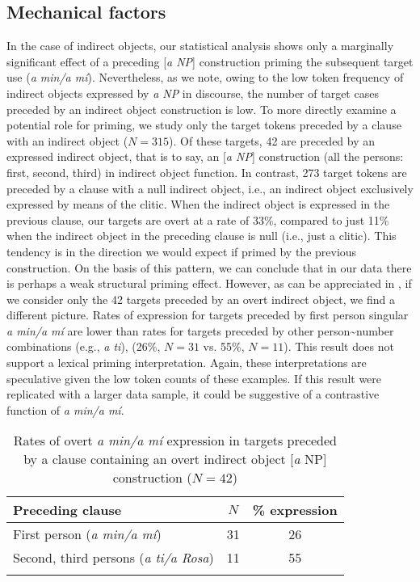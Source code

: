 \documentclass[output=paper]{langscibook}
\begin{document}
\subsection{Mechanical factors} In the case of indirect objects, our statistical analysis shows only a marginally significant effect of a preceding [\textit{a NP}] construction priming the subsequent target use (\textit{a min\slash a mí}). Nevertheless, as we note, owing to the low token frequency of indirect objects expressed by \textit{a NP} in discourse, the number of target cases preceded by an indirect object construction is low. To more directly examine a potential role for priming, we study only the target tokens preceded by a clause with an indirect object ($N=315$). Of these targets, 42 are preceded by an expressed indirect object, that is to say, an [\textit{a NP}] construction (all the persons: first, second, third) in indirect object function. In contrast, 273 target tokens are preceded by a clause with a null indirect object, i.e., an indirect object exclusively expressed by means of the clitic. When the indirect object is expressed in the previous clause, our targets are overt at a rate of 33\%, compared to just 11\% when the indirect object in the preceding clause is null (i.e., just a clitic). This tendency is in the direction we would expect if primed by the previous construction. On the basis of this pattern, we can conclude that in our data there is perhaps a weak structural priming effect. However, as can be appreciated in , if we consider only the 42 targets preceded by an overt indirect object, we find a different picture. Rates of expression for targets preceded by first person singular \textit{a min/a mí} are lower than rates for targets preceded by other person{\textasciitilde}number combinations (e.g., \textit{a ti}), (26\%, $N=31$ vs. 55\%, $N=11$). This result does not support a lexical priming interpretation. Again, these interpretations are speculative given the low token counts of these examples. If this result were replicated with a larger data sample, it could be suggestive of a contrastive function of \textit{a min/a mí}.


\begin{table}[ht]
\begin{tabular}{lcc}
\lsptoprule
Preceding clause & $N$ & \% expression\\\midrule
First person (\textit{a min/a mí}) & 31 & 26\\
Second, third persons (\textit{a ti/a Rosa}) & 11 & 55\\
\lspbottomrule
\end{tabular}
\caption{Rates of overt \textit{a min/a mí} expression in targets preceded by a clause containing an overt indirect object [\textit{a} NP] construction ($N = 42$)\label{tab:brown:3}}
\end{table}
\end{document}
